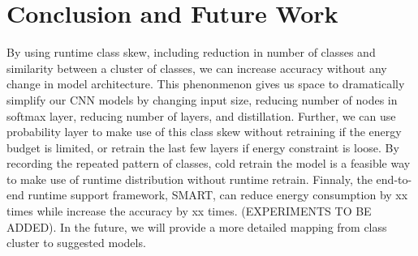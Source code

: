 \documentclass{article}
\begin{document}
\section{Conclusion and Future Work}
By using runtime class skew, including reduction in number of classes and similarity between a cluster of classes, we can increase accuracy without any change in model architecture. This phenonmenon gives us space to dramatically simplify our CNN models by changing input size, reducing number of nodes in softmax layer, reducing number of layers, and distillation.  Further, we can use probability layer to make use of this class skew without retraining if the energy budget is limited, or retrain the last few layers if energy constraint is loose. By recording the repeated pattern of classes, cold retrain the model is a feasible way to make use of runtime distribution without runtime retrain. Finnaly, the end-to-end runtime support framework, SMART, can reduce energy consumption by xx times while increase the accuracy by xx times. (EXPERIMENTS TO BE ADDED). In the future, we will provide a more detailed mapping from class cluster to suggested models.








\end{document}
